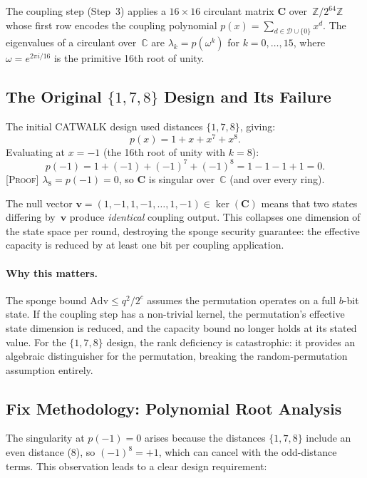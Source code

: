 \documentclass[runningheads]{llncs}
\newcommand{\proof}[1]{\textsc{[Proof]} #1}
\newcommand{\Ztwo}{\mathbb{Z}/2^{64}\mathbb{Z}}
\newcommand{\coupmat}{\mathbf{C}}
\begin{document}
The coupling step (Step~3) applies a $16 \times 16$ circulant matrix $\coupmat$
over~$\Ztwo$ whose first row encodes the coupling polynomial
$p(x) = \sum_{d \in \mathcal{D} \cup \{0\}} x^d$.
The eigenvalues of a circulant over~$\mathbb{C}$ are
$\lambda_k = p(\omega^k)$ for $k = 0, \ldots, 15$,
where $\omega = e^{2\pi i/16}$ is the primitive 16th root of unity.

\subsection{The Original \texorpdfstring{$\{1,7,8\}$}{1,7,8} Design and Its Failure}

The initial CATWALK design used distances $\{1,7,8\}$, giving:
\[
  p(x) = 1 + x + x^7 + x^8.
\]
Evaluating at $x = -1$ (the 16th root of unity with $k = 8$):
\[
  p(-1) = 1 + (-1) + (-1)^7 + (-1)^8 = 1 - 1 - 1 + 1 = 0.
\]
\proof{$\lambda_8 = p(-1) = 0$, so $\coupmat$ is singular over~$\mathbb{C}$ (and over every ring).}

The null vector $\mathbf{v} = (1, -1, 1, -1, \ldots, 1, -1) \in \ker(\coupmat)$
means that two states differing by~$\mathbf{v}$ produce \emph{identical} coupling
output.  This collapses one dimension of the state space per round, destroying
the sponge security guarantee: the effective capacity is reduced by at least
one bit per coupling application.

\paragraph{Why this matters.}
The sponge bound $\mathrm{Adv} \leq q^2/2^c$ assumes the permutation operates
on a full $b$-bit state.  If the coupling step has a non-trivial kernel, the
permutation's effective state dimension is reduced, and the capacity bound no
longer holds at its stated value.  For the $\{1,7,8\}$ design, the rank
deficiency is catastrophic: it provides an algebraic distinguisher for the
permutation, breaking the random-permutation assumption entirely.

\subsection{Fix Methodology: Polynomial Root Analysis}

The singularity at $p(-1) = 0$ arises because the distances $\{1,7,8\}$
include an even distance (8), so $(-1)^8 = +1$, which can cancel with the
odd-distance terms.  This observation leads to a clear design requirement:
\end{document}
